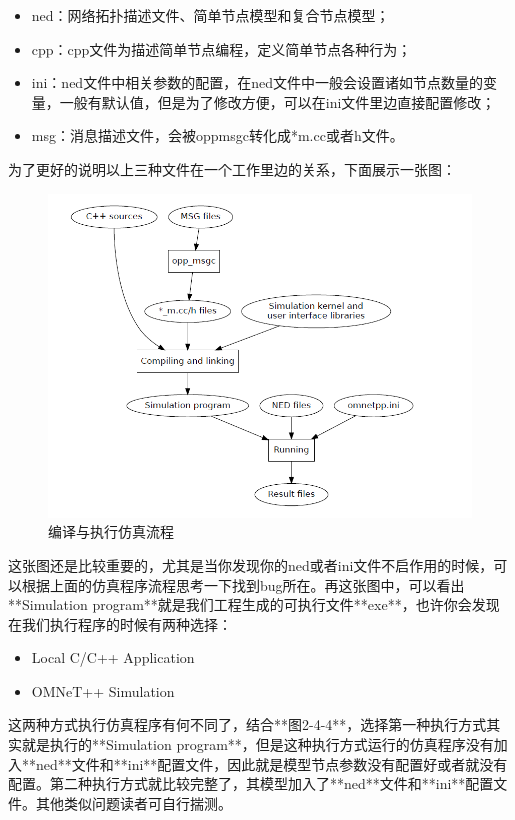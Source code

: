 \begin{itemize}
	\item ned：网络拓扑描述文件、简单节点模型和复合节点模型；
	\item cpp：cpp文件为描述简单节点编程，定义简单节点各种行为；
	\item ini：ned文件中相关参数的配置，在ned文件中一般会设置诸如节点数量的变量，一般有默认值，但是为了修改方便，可以在ini文件里边直接配置修改；
	\item msg：消息描述文件，会被oppmsgc转化成*m.cc或者h文件。
\end{itemize}


为了更好的说明以上三种文件在一个工作里边的关系，下面展示一张图：

\begin{figure}
	\centering
	\includegraphics[width=\textwidth]{../img/chapter2/compile_exec}
	\caption{编译与执行仿真流程}\label{fig:1a}
\end{figure}

这张图还是比较重要的，尤其是当你发现你的ned或者ini文件不启作用的时候，可以根据上面的仿真程序流程思考一下找到bug所在。再这张图中，可以看出**Simulation program**就是我们工程生成的可执行文件**exe**，也许你会发现在我们执行程序的时候有两种选择：

\begin{itemize}
	\item Local C/C++ Application
	\item OMNeT++ Simulation
\end{itemize}

这两种方式执行仿真程序有何不同了，结合**图2-4-4**，选择第一种执行方式其实就是执行的**Simulation program**，但是这种执行方式运行的仿真程序没有加入**ned**文件和**ini**配置文件，因此就是模型节点参数没有配置好或者就没有配置。第二种执行方式就比较完整了，其模型加入了**ned**文件和**ini**配置文件。其他类似问题读者可自行揣测。

